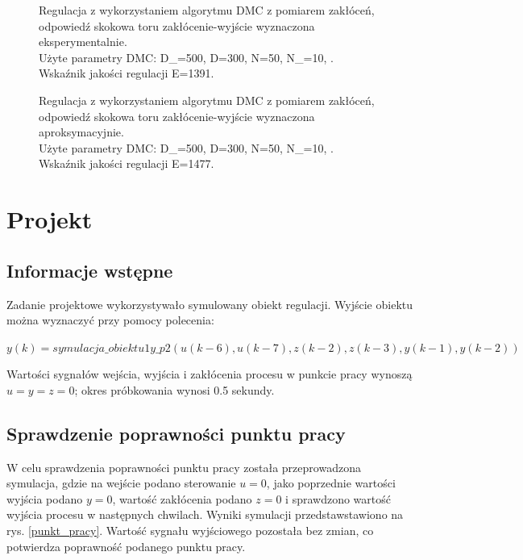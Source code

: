 \documentclass[a4paper,titlepage,11pt,twosides,floatssmall]{mwrep}
\begin{document}
\begin{figure}[H]
	\centering
	
	\caption{Regulacja z wykorzystaniem algorytmu DMC z pomiarem zakłóceń, odpowiedź skokowa toru zakłócenie-wyjście wyznaczona eksperymentalnie. \\Użyte parametry DMC: D_{}=500, D=300, N=50, N_{}=10, .\\ Wskaźnik jakości regulacji E=1391.}
	\label{kom_s_eksp}
\end{figure}


\begin{figure}[H]
	\centering
	
	\caption{Regulacja z wykorzystaniem algorytmu DMC z pomiarem zakłóceń, odpowiedź skokowa toru zakłócenie-wyjście wyznaczona aproksymacyjnie. \\Użyte parametry DMC: D_{}=500, D=300, N=50, N_{}=10, .\\ Wskaźnik jakości regulacji E=1477.}
	\label{kom_s_apro}
\end{figure}



\chapter{Projekt}
\section{Informacje wstępne}

Zadanie projektowe wykorzystywało symulowany obiekt regulacji. Wyjście obiektu można wyznaczyć przy pomocy polecenia:

$y(k)=symulacja\_obiektu1y\_p2(u(k-6),u(k-7),z(k-2),z(k-3),y(k-1),y(k-2))$

Wartości sygnałów wejścia, wyjścia i zakłócenia procesu w punkcie pracy wynoszą $u = y = z = 0$; okres próbkowania wynosi \num{0,5} sekundy.


\section{Sprawdzenie poprawności punktu pracy}

W celu sprawdzenia poprawności punktu pracy została przeprowadzona symulacja, gdzie na wejście podano sterowanie $u = 0$, jako poprzednie wartości wyjścia podano $y = 0$, wartość zakłócenia podano $z = 0$ i sprawdzono wartość wyjścia procesu w następnych chwilach. Wyniki symulacji przedstawstawiono na rys. \ref{punkt_pracy}. Wartość sygnału wyjściowego pozostała bez zmian, co potwierdza poprawność podanego punktu pracy.
\end{document}
